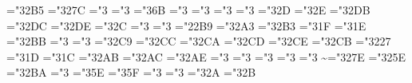 {\mathchardef\propto="32B5
\mathchardef\mid="327C
\if@usecmsy
 \mathchardef\sqsubseteq="3
 \mathchardef\sqsupseteq="3
 \mathchardef\parallel="3\cmsy@6B
 \mathchardef\dashv="3
 \mathchardef\vdash="3
 \mathchardef\nearrow="3
 \mathchardef\searrow="3
 \mathchardef\nwarrow="3\cmsy@2D
 \mathchardef\swarrow="3\cmsy@2E
\else
 \def\sqsubseteq{\@PSnofont\sqsubseteq}
 \def\sqsupseteq{\@PSnofont\sqsupseteq}
 \def\parallel{\@PSnofont\parallel}
 \def\dashv{\@PSnofont\dashv}
 \def\vdash{\@PSnofont\vdash}
 \def\nearrow{\@PSnofont\nearrow}
 \def\searrow{\@PSnofont\searrow}
 \def\nwarrow{\@PSnofont\nwarrow}
 \def\swarrow{\@PSnofont\swarrow}
\fi
\mathchardef\Leftrightarrow="32DB
\mathchardef\Leftarrow="32DC
\mathchardef\Rightarrow="32DE
\if@usecmsy
 \mathchardef\cmsyLeftrightarrow="3\cmsy@2C
 \mathchardef\cmsyLeftarrow="3
 \mathchardef\cmsyRightarrow="3
\fi
\mathchardef\ne="22B9 \let\neq=\ne
\def\not#1{\rlap{\kern.5em\lower.25ex\hbox{\mathhexbox2A4}}#1}
\mathchardef\leq="32A3 \let\le=\leq
\mathchardef\geq="32B3 \let\ge=\geq
\if@usecmsy
 \mathchardef\succ="3\cmsy@1F
 \mathchardef\prec="3\cmsy@1E
\else
 \def\succ{\@PSnofont\succ}
 \def\prec{\@PSnofont\prec}
\fi
\mathchardef\approx="32BB
\if@usecmsy
 \mathchardef\succeq="3
 \mathchardef\preceq="3
\else
 \def\succeq{\@PSnofont\succeq}
 \def\preceq{\@PSnofont\preceq}
\fi
\mathchardef\supset="32C9
\mathchardef\subset="32CC
\mathchardef\supseteq="32CA
\mathchardef\subseteq="32CD
\mathchardef\in="32CE
\mathchardef\notsub="32CB %
\mathchardef\ni="3227 \let\owns=\ni
\if@usecmsy
 \mathchardef\gg="3\cmsy@1D
 \mathchardef\ll="3\cmsy@1C
\else
 \def\gg{\@PSnofont\gg}
 \def\ll{\@PSnofont\ll}
\fi
\mathchardef\leftrightarrow="32AB
\mathchardef\leftarrow="32AC \let\gets=\leftarrow
\mathchardef\rightarrow="32AE \let\to=\rightarrow
\if@usecmsy
 \mathchardef\cmsyleftrightarrow="3
 \mathchardef\cmsyleftarrow="3
 \mathchardef\cmsyrightarrow="3
 \mathchardef\mapstochar="3 \def\mapsto{\mapstochar\cmsyrightarrow}
 \mathchardef\simeq="3
\else
 \def\mapstochar{\@PSnofont\mapstochar}
 \def\simeq{\@PSnofont\simeq}
\fi
\mathchardef\sim="327E
\mathchardef\perp="325E
\mathchardef\equiv="32BA
\if@usecmsy
 \mathchardef\asymp="3
\else
 \def\asymp{\@PSnofont\asymp}
\fi
\if@usecmmi
 \mathchardef\smile="3\cmmi@5E
 \mathchardef\frown="3\cmmi@5F
 \mathchardef\leftharpoonup="3
 \mathchardef\leftharpoondown="3
 \mathchardef\rightharpoonup="3\cmmi@2A
 \mathchardef\rightharpoondown="3\cmmi@2B
\else
 \def\smile{\@PSnofont\smile}
 \def\frown{\@PSnofont\frown}
 \def\leftharpoonup{\@PSnofont\leftharpoonup}
 \def\rightharpoonup{\@PSnofont\rightharpoonup}
 \def\leftharpoondown{\@PSnofont\leftharpoondown}
 \def\rightharpoondown{\@PSnofont\rightharpoondown}
\fi

}
